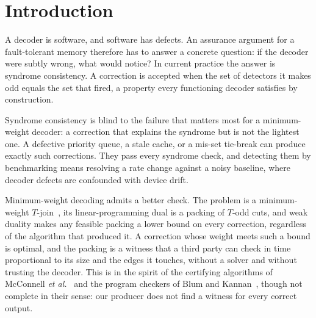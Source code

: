 \documentclass[aps,pra,twocolumn,superscriptaddress,nofootinbib,longbibliography,floatfix]{revtex4-2}
\begin{document}
\section{Introduction}
\label{sec:intro}

A decoder is software, and software has defects. An assurance argument for a fault-tolerant memory therefore has to answer a concrete question: if the decoder were subtly wrong, what would notice? In current practice the answer is syndrome consistency. A correction is accepted when the set of detectors it makes odd equals the set that fired, a property every functioning decoder satisfies by construction.

Syndrome consistency is blind to the failure that matters most for a minimum-weight decoder: a correction that explains the syndrome but is not the lightest one. A defective priority queue, a stale cache, or a mis-set tie-break can produce exactly such corrections. They pass every syndrome check, and detecting them by benchmarking means resolving a rate change against a noisy baseline, where decoder defects are confounded with device drift.

Minimum-weight decoding admits a better check. The problem is a minimum-weight $T$-join~\cite{edmondsjohnson1973}, its linear-programming dual is a packing of $T$-odd cuts, and weak duality makes any feasible packing a lower bound on every correction, regardless of the algorithm that produced it. A correction whose weight meets such a bound is optimal, and the packing is a witness that a third party can check in time proportional to its size and the edges it touches, without a solver and without trusting the decoder. This is in the spirit of the certifying algorithms of McConnell \textit{et al.}~\cite{mcconnell2011certifying} and the program checkers of Blum and Kannan~\cite{blumkannan1995}, though not complete in their sense: our producer does not find a witness for every correct output.
\end{document}
